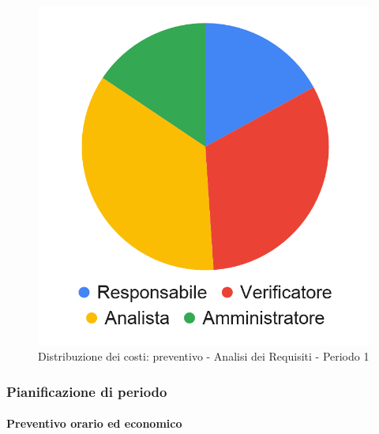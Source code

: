 \hspace{-1cm}
\begin{minipage}{.50\textwidth}
\smallPreventivoTable{
	
}
\end{minipage}
\hspace{1cm}
\begin{minipage}{.40\textwidth}
\begin{figure}[H]
	\includegraphics[scale=0.21]{res/images/charts/preventivo_priori/Grafico4-1.png}
	\caption{Distribuzione dei costi: preventivo - Analisi dei Requisiti - Periodo 1}
\end{figure}\end{minipage} 


\subsubsection{Pianificazione di periodo}

\paragraph{Preventivo orario ed economico}
\subparagraph*{}

\contabilitaTable{
	
}

